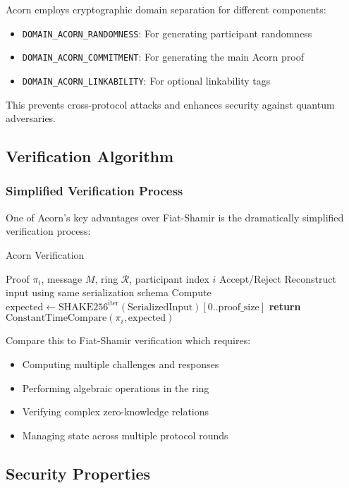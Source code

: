 \documentclass[11pt,a4paper]{article}
\begin{document}
Acorn employs cryptographic domain separation for different components:
\begin{itemize}
\item \texttt{DOMAIN\_ACORN\_RANDOMNESS}: For generating participant randomness
\item \texttt{DOMAIN\_ACORN\_COMMITMENT}: For generating the main Acorn proof
\item \texttt{DOMAIN\_ACORN\_LINKABILITY}: For optional linkability tags
\end{itemize}

This prevents cross-protocol attacks and enhances security against quantum adversaries.

\subsection{Verification Algorithm}

\subsubsection{Simplified Verification Process}

One of Acorn's key advantages over Fiat-Shamir is the dramatically simplified verification process:

\begin{algorithm}
\caption{Acorn Verification}
\begin{algorithmic}[1]
\REQUIRE Proof $\pi_i$, message $M$, ring $\mathcal{R}$, participant index $i$
\ENSURE Accept/Reject
\STATE Reconstruct input using same serialization schema
\STATE Compute $\text{expected} \leftarrow \text{SHAKE256}^{\text{iter}}(\text{SerializedInput})[0..\text{proof\_size}]$
\STATE \textbf{return} $\text{ConstantTimeCompare}(\pi_i, \text{expected})$
\end{algorithmic}
\end{algorithm}

Compare this to Fiat-Shamir verification which requires:
\begin{itemize}
\item Computing multiple challenges and responses
\item Performing algebraic operations in the ring
\item Verifying complex zero-knowledge relations
\item Managing state across multiple protocol rounds
\end{itemize}

\subsection{Security Properties}
\end{document}
